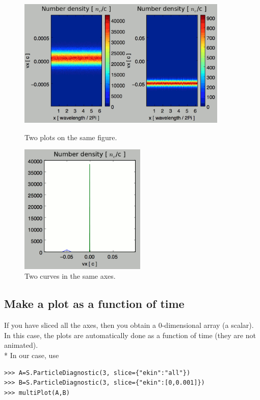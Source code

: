 \documentclass[11pt]{article}
\begin{document}
\begin{figure}[htbp]
\centering
\begin{minipage}[b]{.48\linewidth}
\includegraphics[width=10cm]{ParticleDiagTutorial5}
\caption{Two plots on the same figure.}
\label{Tuto5}
\end{minipage}
\hfill{}
\begin{minipage}[b]{.38\linewidth}
\includegraphics[width=6cm]{ParticleDiagTutorial6}
\caption{Two curves in the same axes.}
\label{Tuto6}
\end{minipage}
\end{figure}


\subsection{Make a plot as a function of time}
If you have sliced all the axes, then you obtain a 0-dimensional array (a scalar). In this case, the plots are automatically done 
as a function of time (they are not animated).\\*
In our case, use
\begin{lstlisting}
>>> A=S.ParticleDiagnostic(3, slice={"ekin":"all"})
>>> B=S.ParticleDiagnostic(3, slice={"ekin":[0,0.001]})
>>> multiPlot(A,B)
\end{lstlisting}
\end{document}
